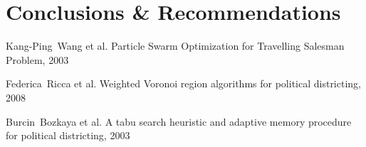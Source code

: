 \documentclass[journal]{IEEEtran}
\begin{document}
\section{Conclusions \& Recommendations}



\begin{thebibliography}{1}

Kang-Ping~Wang et al. Particle Swarm Optimization for Travelling Salesman
        Problem, 2003

Federica~Ricca et al. Weighted Voronoi region algorithms for political
        districting, 2008

    Burcin~Bozkaya et al.  A tabu search heuristic and adaptive memory procedure
        for political districting, 2003
\end{thebibliography}
\end{document}
